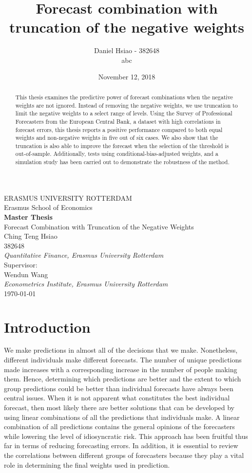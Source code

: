 \documentclass[11pt]{article}
\title{Forecast combination with truncation of the negative weights}
\author{
	Daniel Hsiao - 382648\\[2.5cm]
	abc}
\date{November 12, 2018}
\begin{document}
	\begin{titlepage}
		\centering
		{\LARGE ERASMUS UNIVERSITY ROTTERDAM}\\[0.5cm]
		{\large Erasmus School of Economics}\\[1.5cm] 
		{\large \textbf{Master Thesis}}\\[0.5cm] 	
		{\LARGE Forecast Combination with Truncation of the Negative Weights}\\[1cm] 
		{\large Ching Teng Hsiao}\\382648\\
		\textit{Quantitative Finance, Erasmus University Rotterdam}\\[1.5cm]
		{\large Supervisor: \\Wendun Wang}\\
		\textit{Econometrics Institute, Erasmus University Rotterdam}\\[ 1cm]
		{\large \today}\\[2.5cm]
		\begin{abstract}
			This thesis examines the predictive power of forecast combinations when the negative weights are not ignored. Instead of removing the negative weights, we use truncation to limit the negative weights to a select range of levels. Using the Survey of Professional Forecasters from the European Central Bank, a dataset with high correlations in forecast errors, this thesis reports a positive performance compared to both equal weights and non-negative weights in five out of six cases. We also show that the truncation is also able to improve the forecast when the selection of the threshold is out-of-sample. Additionally, tests using conditional-bias-adjusted weights, and a simulation study has been carried out to demonstrate the robustness of the method.
		\end{abstract}
	\end{titlepage}
	
	\newpage
	{
		\setcounter{tocdepth}{3}
		\tableofcontents
	}
	\newpage
	
	
	\section{Introduction}\label{introduction}
	We make predictions in almost all of the decisions that we make. Nonetheless, different individuals make different forecasts. The number of unique predictions made increases with a corresponding increase in the number of people making them. Hence, determining which predictions are better and the extent to which group predictions could be better than individual forecasts have always been central issues. When it is not apparent what constitutes the best individual forecast, then most likely there are better solutions that can be developed by using linear combinations of all the predictions that individuals make. A linear combination of all predictions contains the general opinions of the forecasters while lowering the level of idiosyncratic risk. This approach has been fruitful thus far in terms of reducing forecasting errors. In addition, it is essential to review the correlations between different groups of forecasters because they play a vital role in determining the final weights used in prediction.
	
\end{document}

